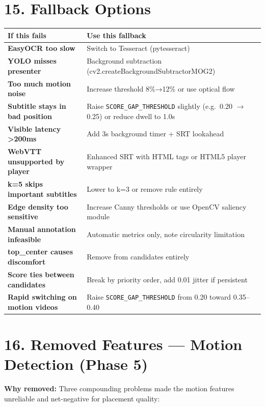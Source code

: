 \documentclass[11pt]{article}
\begin{document}
\section*{15. Fallback Options}
\begin{tabularx}{\textwidth}{>{\bfseries}l X}
If this fails & Use this fallback \\
\midrule
EasyOCR too slow & Switch to Tesseract (pytesseract) \\
YOLO misses presenter & Background subtraction (cv2.createBackgroundSubtractorMOG2) \\
Too much motion noise & Increase threshold 8\%→12\% or use optical flow \\
Subtitle stays in bad position & Raise \texttt{SCORE\_GAP\_THRESHOLD} slightly (e.g.\ 0.20 $\rightarrow$ 0.25) or reduce dwell to 1.0s \\
Visible latency >200ms & Add 3s background timer + SRT lookahead \\
WebVTT unsupported by player & Enhanced SRT with HTML tags or HTML5 player wrapper \\
k=5 skips important subtitles & Lower to k=3 or remove rule entirely \\
Edge density too sensitive & Increase Canny thresholds or use OpenCV saliency module \\
Manual annotation infeasible & Automatic metrics only, note circularity limitation \\
top\_center causes discomfort & Remove from candidates entirely \\
Score ties between candidates & Break by priority order, add 0.01 jitter if persistent \\
Rapid switching on motion videos & Raise \texttt{SCORE\_GAP\_THRESHOLD} from 0.20 toward 0.35--0.40 \\
\end{tabularx}

\bigskip

\section*{16. Removed Features --- Motion Detection (Phase 5)}

\textbf{Why removed:} Three compounding problems made the motion features unreliable and net-negative for placement quality:
\end{document}
